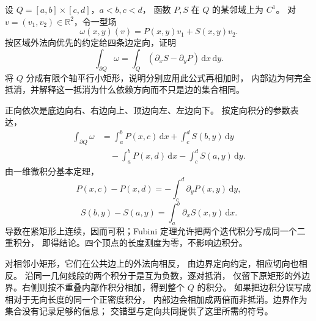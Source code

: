\begin{exercise}\label{b1:ex:app-b-rectangle-boundary}
设 \(Q=[a,b]\times[c,d]\)，\(a<b,c<d\)，
函数 \(P,S\) 在 \(Q\) 的某邻域上为 \(C^1\)。
对 \(v=(v_1,v_2)\in\mathbb R^2\)，令一型场
\[
 \omega(x,y)(v)=P(x,y)v_1+S(x,y)v_2.
\]
按区域外法向优先的约定给四条边定向，证明
\[
 \int_{\partial Q}\omega
   =\int_Q(\partial_xS-\partial_yP)\,\mathrm dx\,\mathrm dy.
\]
将 \(Q\) 分成有限个轴平行小矩形，说明分别应用此公式再相加时，
内部边为何完全抵消，并解释这一抵消为什么依赖方向而不只是边的集合相同。
\end{exercise}
\begin{solution}
正向依次是底边向右、右边向上、顶边向左、左边向下。
按定向积分的参数表达，
\[
 \begin{aligned}
 \int_{\partial Q}\omega
  &=\int_a^bP(x,c)\,\mathrm dx
     +\int_c^dS(b,y)\,\mathrm dy\\
  &\quad-\int_a^bP(x,d)\,\mathrm dx
     -\int_c^dS(a,y)\,\mathrm dy.
 \end{aligned}
\]
由一维微积分基本定理，
\[
 P(x,c)-P(x,d)=-\int_c^d\partial_yP(x,y)\,\mathrm dy,
\]
\[
 S(b,y)-S(a,y)=\int_a^b\partial_xS(x,y)\,\mathrm dx.
\]
导数在紧矩形上连续，因而可积；Fubini 定理允许把两个迭代积分写成同一个二重积分，
即得结论。四个顶点的长度测度为零，不影响边积分。

对相邻小矩形，它们在公共边上的外法向相反，
由边界定向约定，相应切向也相反。
沿同一几何线段的两个积分于是互为负数，逐对抵消，
仅留下原矩形的外边界。右侧则按不重叠内部作积分相加，得到整个 \(Q\) 的积分。
如果把边积分误写成相对于无向长度的同一个正密度积分，
内部边会相加成两倍而非抵消。边界作为集合没有记录足够的信息；
交错型与定向共同提供了这里所需的符号。
\end{solution}
